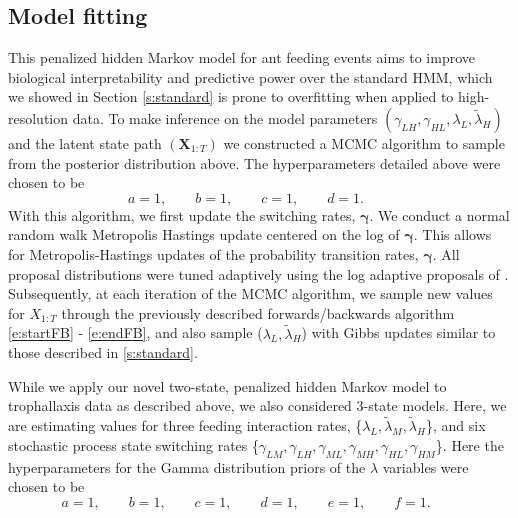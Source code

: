 \documentclass[smallextended]{svjour3}       %
\begin{document}
\subsection{Model fitting}
% 
This penalized hidden Markov model for ant feeding events aims to improve biological interpretability and predictive power over the standard HMM, which we showed in Section \ref{s:standard} is prone to overfitting when applied to high-resolution data. To make inference on the model parameters $(\gamma_{LH}, \gamma_{HL}, \lambda_L, \tilde{\lambda}_H)$ and the latent state path $(\mathbf{X}_{1:T})$ we constructed a MCMC algorithm to sample from the posterior distribution above. The hyperparameters detailed above were chosen to be 
\begin{equation}
a = 1, \qquad
b = 1, \qquad
c = 1, \qquad
d = 1. \qquad
\end{equation}
With this algorithm, we first update the switching rates, $\bm{\gamma}$. We conduct a normal random walk Metropolis Hastings update centered on the log of $\bm{\gamma}$. This allows for Metropolis-Hastings updates of the probability transition rates, $\bm{\gamma}$. All proposal distributions were tuned adaptively using the log adaptive proposals of \cite{Shaby2010}. Subsequently, at each iteration of the MCMC algorithm, we sample new values for $X_{1:T}$ through the previously described forwards/backwards algorithm \eqref{e:startFB} - \eqref{e:endFB}, and also sample ($\lambda_L, \tilde{\lambda}_H$) with Gibbs updates similar to those described in \ref{s:standard}. 

While we apply our novel two-state, penalized hidden Markov model to trophallaxis data as described above,  we also considered 3-state models. Here, we are estimating values for three feeding interaction rates, \{$\lambda_L, \tilde{\lambda}_M, \tilde{\lambda}_H$\}, and six stochastic process state switching rates \{$\gamma_{LM}, \gamma_{LH}, \gamma_{ML}, \gamma_{MH}, \gamma_{HL}, \gamma_{HM}$\}. Here the hyperparameters for the Gamma distribution priors of the $\lambda$ variables were chosen to be 
\begin{equation}
a = 1, \qquad
b = 1, \qquad
c = 1, \qquad
d = 1, \qquad
e = 1, \qquad
f = 1. \qquad
\end{equation}
% 
\end{document}
